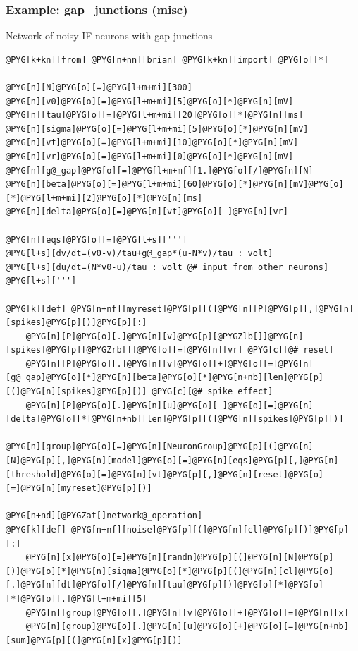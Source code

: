 \documentclass[letterpaper,10pt,english]{manual}
\begin{document}
\hypertarget{index-46}{}\subsubsection{Example: gap\_junctions (misc)}

Network of noisy IF neurons with gap junctions

\begin{Verbatim}[commandchars=@\[\]]
@PYG[k+kn][from] @PYG[n+nn][brian] @PYG[k+kn][import] @PYG[o][*]

@PYG[n][N]@PYG[o][=]@PYG[l+m+mi][300]
@PYG[n][v0]@PYG[o][=]@PYG[l+m+mi][5]@PYG[o][*]@PYG[n][mV]
@PYG[n][tau]@PYG[o][=]@PYG[l+m+mi][20]@PYG[o][*]@PYG[n][ms]
@PYG[n][sigma]@PYG[o][=]@PYG[l+m+mi][5]@PYG[o][*]@PYG[n][mV]
@PYG[n][vt]@PYG[o][=]@PYG[l+m+mi][10]@PYG[o][*]@PYG[n][mV]
@PYG[n][vr]@PYG[o][=]@PYG[l+m+mi][0]@PYG[o][*]@PYG[n][mV]
@PYG[n][g@_gap]@PYG[o][=]@PYG[l+m+mf][1.]@PYG[o][/]@PYG[n][N]
@PYG[n][beta]@PYG[o][=]@PYG[l+m+mi][60]@PYG[o][*]@PYG[n][mV]@PYG[o][*]@PYG[l+m+mi][2]@PYG[o][*]@PYG[n][ms]
@PYG[n][delta]@PYG[o][=]@PYG[n][vt]@PYG[o][-]@PYG[n][vr]

@PYG[n][eqs]@PYG[o][=]@PYG[l+s][''']
@PYG[l+s][dv/dt=(v0-v)/tau+g@_gap*(u-N*v)/tau : volt]
@PYG[l+s][du/dt=(N*v0-u)/tau : volt @# input from other neurons]
@PYG[l+s][''']

@PYG[k][def] @PYG[n+nf][myreset]@PYG[p][(]@PYG[n][P]@PYG[p][,]@PYG[n][spikes]@PYG[p][)]@PYG[p][:]
    @PYG[n][P]@PYG[o][.]@PYG[n][v]@PYG[p][@PYGZlb[]]@PYG[n][spikes]@PYG[p][@PYGZrb[]]@PYG[o][=]@PYG[n][vr] @PYG[c][@# reset]
    @PYG[n][P]@PYG[o][.]@PYG[n][v]@PYG[o][+]@PYG[o][=]@PYG[n][g@_gap]@PYG[o][*]@PYG[n][beta]@PYG[o][*]@PYG[n+nb][len]@PYG[p][(]@PYG[n][spikes]@PYG[p][)] @PYG[c][@# spike effect]
    @PYG[n][P]@PYG[o][.]@PYG[n][u]@PYG[o][-]@PYG[o][=]@PYG[n][delta]@PYG[o][*]@PYG[n+nb][len]@PYG[p][(]@PYG[n][spikes]@PYG[p][)]

@PYG[n][group]@PYG[o][=]@PYG[n][NeuronGroup]@PYG[p][(]@PYG[n][N]@PYG[p][,]@PYG[n][model]@PYG[o][=]@PYG[n][eqs]@PYG[p][,]@PYG[n][threshold]@PYG[o][=]@PYG[n][vt]@PYG[p][,]@PYG[n][reset]@PYG[o][=]@PYG[n][myreset]@PYG[p][)]

@PYG[n+nd][@PYGZat[]network@_operation]
@PYG[k][def] @PYG[n+nf][noise]@PYG[p][(]@PYG[n][cl]@PYG[p][)]@PYG[p][:]
    @PYG[n][x]@PYG[o][=]@PYG[n][randn]@PYG[p][(]@PYG[n][N]@PYG[p][)]@PYG[o][*]@PYG[n][sigma]@PYG[o][*]@PYG[p][(]@PYG[n][cl]@PYG[o][.]@PYG[n][dt]@PYG[o][/]@PYG[n][tau]@PYG[p][)]@PYG[o][*]@PYG[o][*]@PYG[o][.]@PYG[l+m+mi][5]
    @PYG[n][group]@PYG[o][.]@PYG[n][v]@PYG[o][+]@PYG[o][=]@PYG[n][x]
    @PYG[n][group]@PYG[o][.]@PYG[n][u]@PYG[o][+]@PYG[o][=]@PYG[n+nb][sum]@PYG[p][(]@PYG[n][x]@PYG[p][)]


\end{Verbatim}
\end{document}
